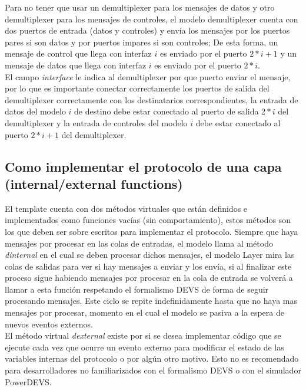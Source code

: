 \documentclass[10pt,a4paper]{article}
\begin{document}
Para no tener que usar un demultiplexer para los mensajes de datos y otro demultiplexer para los mensajes de controles, el modelo demultiplexer cuenta con dos puertos de entrada (datos y controles) y envía los mensajes por los puertos pares si son datos y por puertos impares si son controles; De esta forma, un mensaje de control que llega con interfaz $i$ es enviado por el puerto $2*i+1$ y un mensaje de datos que llega con interfaz $i$ es enviado por el puerto $2*i$. \\

El campo \textit{interface} le indica al demultiplexer por que puerto enviar el mensaje, por lo que es importante conectar correctamente los puertos de salida del demultiplexer correctamente con los destinatarios correspondientes, la entrada de datos del modelo $i$ de destino debe estar conectado al puerto de salida $2*i$ del demultiplexer y la entrada de controles del modelo $i$ debe estar conectado al puerto $2*i+1$ del demultiplexer. \\

\subsection{Como implementar el protocolo de una capa (internal/external functions)}

El template cuenta con dos métodos virtuales que están definidos e implementados como funciones vacías (sin comportamiento), estos métodos son los que deben ser sobre escritos para implementar el protocolo. Siempre que haya mensajes por procesar en las colas de entradas, el modelo llama al método \textit{dinternal} en el cual se deben procesar dichos mensajes, el modelo Layer mira las colas de salidas para ver si hay mensajes a enviar y los envía, si al finalizar este proceso sigue habiendo mensajes por procesar en la cola de entrada se volverá a llamar a esta función respetando el formalismo DEVS de forma de seguir procesando mensajes. Este ciclo se repite indefinidamente hasta que no haya mas mensajes por procesar, momento en el cual el modelo se pasiva a la espera de nuevos eventos externos. \\

El método virtual \textit{dexternal} existe por si se desea implementar código que se ejecute cada vez que ocurre un evento externo para modificar el estado de las variables internas del protocolo o por algún otro motivo. Esto no es recomendado para desarrolladores no familiarizados con el formalismo DEVS o con el simulador PowerDEVS. \\
\end{document}
